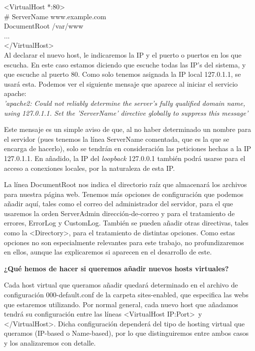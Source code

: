 \documentclass[a4paper, 10pt]{article} %
\begin{document}
<VirtualHost *:80> \\
	\# ServerName www.example.com\\
	DocumentRoot /var/www \\
	...\\
</VirtualHost>\\

Al declarar el nuevo host, le indicaremos la IP y el puerto o puertos en los que escucha. En este caso estamos diciendo que escuche todas las IP's del sistema, y que escuche al puerto 80. Como solo tenemos asignada la IP local 127.0.1.1, se usará esta. Podemos ver el siguiente mensaje que aparece al iniciar el servicio apache: \\
\textit{'apache2: Could not reliably determine the server's fully qualified domain name, using 127.0.1.1. Set the 'ServerName' directive globally to suppress this message'}

Este mensaje es un simple aviso de que, al no haber determinado un nombre para el servidor (pues tenemos la línea ServerName comentada, que es la que se encarga de hacerlo), solo se tendrán en consideración las peticiones hechas a la IP 127.0.1.1. En añadido, la IP del \textit{loopback} 127.0.0.1 también podrá usarse para el acceso a conexiones locales, por la naturaleza de esta IP. 

La línea DocumentRoot nos indica el directorio raíz que almacenará los archivos para nuestra página web. Tenemos más opciones de configuración que podemos añadir aquí, tales como el correo del administrador del servidor, para el que usaremos la orden ServerAdmin dirección-de-correo y para el tratamiento de errores, ErrorLog y CustomLog. También se pueden añadir otras directivas, tales como la <Directory>, para el tratamiento de distintas opciones. Como estas opciones no son especialmente relevantes para este trabajo, no profundizaremos en ellos, aunque las explicaremos si aparecen en el desarrollo de este. 

\textbf{¿Qué hemos de hacer si queremos añadir nuevos hosts virtuales?}

Cada host virtual que queramos añadir quedará determinado en el archivo de configuración 000-default.conf de la carpeta sites-enabled, que especifica las webs que estaremos utilizando. Por normal general, cada nuevo host que añadamos tendrá su configuración entre las líneas <VirtualHost IP:Port>\ y </VirtualHost>. Dicha configuración dependerá del tipo de hosting virtual que queramos (IP-based o Name-based), por lo que distinguiremos entre ambos casos y los analizaremos con detalle. 
\end{document}

